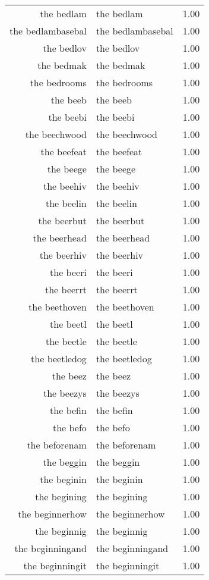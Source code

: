 \begin{table}[ht]
\begin{tabular}{rlr}
  the bedlam & the bedlam & 1.00 \\ 
  the bedlambasebal & the bedlambasebal & 1.00 \\ 
  the bedlov & the bedlov & 1.00 \\ 
  the bedmak & the bedmak & 1.00 \\ 
  the bedrooms & the bedrooms & 1.00 \\ 
  the beeb & the beeb & 1.00 \\ 
  the beebi & the beebi & 1.00 \\ 
  the beechwood & the beechwood & 1.00 \\ 
  the beefeat & the beefeat & 1.00 \\ 
  the beege & the beege & 1.00 \\ 
  the beehiv & the beehiv & 1.00 \\ 
  the beelin & the beelin & 1.00 \\ 
  the beerbut & the beerbut & 1.00 \\ 
  the beerhead & the beerhead & 1.00 \\ 
  the beerhiv & the beerhiv & 1.00 \\ 
  the beeri & the beeri & 1.00 \\ 
  the beerrt & the beerrt & 1.00 \\ 
  the beethoven & the beethoven & 1.00 \\ 
  the beetl & the beetl & 1.00 \\ 
  the beetle & the beetle & 1.00 \\ 
  the beetledog & the beetledog & 1.00 \\ 
  the beez & the beez & 1.00 \\ 
  the beezys & the beezys & 1.00 \\ 
  the befin & the befin & 1.00 \\ 
  the befo & the befo & 1.00 \\ 
  the beforenam & the beforenam & 1.00 \\ 
  the beggin & the beggin & 1.00 \\ 
  the beginin & the beginin & 1.00 \\ 
  the begining & the begining & 1.00 \\ 
  the beginnerhow & the beginnerhow & 1.00 \\ 
  the beginnig & the beginnig & 1.00 \\ 
  the beginningand & the beginningand & 1.00 \\ 
  the beginningit & the beginningit & 1.00 \\ 

\end{tabular}
\end{table}

